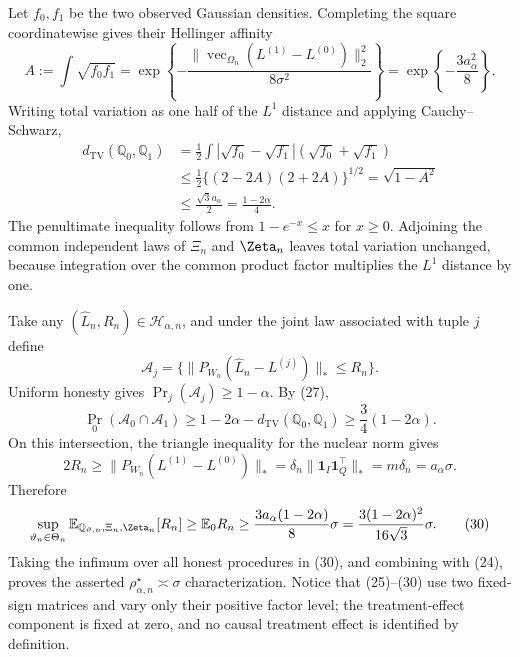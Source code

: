 Let \(f_0,f_1\) be the two observed Gaussian densities.  Completing the square coordinatewise gives their Hellinger affinity
\[
A:=\int\sqrt{f_0f_1}
=\exp\!\left\{-\frac{\lVert
\operatorname{vec}_{\Omega_n}(L^{(1)}-L^{(0)})\rVert_2^2}{8\sigma^2}\right\}
=\exp\!\left\{-\frac{3a_\alpha^2}{8}\right\}.           \tag{26}
\]
Writing total variation as one half of the \(L^1\) distance and applying Cauchy--Schwarz,
\[
\begin{aligned}
d_{\mathrm{TV}}(\mathbb Q_0,\mathbb Q_1)
&=\frac12\int|\sqrt{f_0}-\sqrt{f_1}|(\sqrt{f_0}+\sqrt{f_1})\\
&\le\frac12\{(2-2A)(2+2A)\}^{1/2}
=\sqrt{1-A^2}\\
&\le\frac{\sqrt3a_\alpha}{2}
=\frac{1-2\alpha}{4}.                                    \tag{27}
\end{aligned}
\]
The penultimate inequality follows from \(1-e^{-x}\le x\) for \(x\ge0\).  Adjoining the common independent laws of \(\Xi_n\) and \(\Zeta_n\) leaves total variation unchanged, because integration over the common product factor multiplies the \(L^1\) distance by one.

Take any \((\widehat L_n,R_n)\in\mathcal H_{\alpha,n}\), and under the joint law associated with tuple \(j\) define
\[
\mathcal A_j=
\{\lVert P_{W_n}(\widehat L_n-L^{(j)})\rVert_*\le R_n\}.
\]
Uniform honesty gives \(\Pr_j(\mathcal A_j)\ge1-\alpha\).  By (27),
\[
\Pr_0(\mathcal A_0\cap\mathcal A_1)
\ge1-2\alpha-d_{\mathrm{TV}}(\mathbb Q_0,\mathbb Q_1)
\ge\frac34(1-2\alpha).                                   \tag{28}
\]
On this intersection, the triangle inequality for the nuclear norm gives
\[
2R_n\ge\lVert P_{W_n}(L^{(1)}-L^{(0)})\rVert_*
=\delta_n\lVert\mathbf1_I\mathbf1_Q^{\top}\rVert_*
=m\delta_n=a_\alpha\sigma.                               \tag{29}
\]
Therefore
\[
\sup_{\vartheta_n\in\Theta_n}
\mathbb E_{\mathbb Q_{\vartheta,n},\Xi_n,\Zeta_n}[R_n]
\ge\mathbb E_0R_n
\ge\frac{3a_\alpha(1-2\alpha)}8\sigma
=\frac{3(1-2\alpha)^2}{16\sqrt3}\sigma.                 \tag{30}
\]
Taking the infimum over all honest procedures in (30), and combining with (24), proves the asserted \(\rho_{\alpha,n}^{\star}\asymp\sigma\) characterization.  Notice that (25)--(30) use two fixed-sign matrices and vary only their positive factor level; the treatment-effect component is fixed at zero, and no causal treatment effect is identified by definition.

